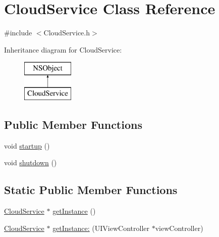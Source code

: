 \hypertarget{interface_cloud_service}{
\section{\-Cloud\-Service \-Class \-Reference}
\label{interface_cloud_service}
}


{\ttfamily \#include $<$\-Cloud\-Service.\-h$>$}

\-Inheritance diagram for \-Cloud\-Service\-:\begin{figure}[H]
\begin{center}
\leavevmode
\includegraphics[height=2.000000cm]{interface_cloud_service}
\end{center}
\end{figure}
\subsection*{\-Public \-Member \-Functions}
\begin{DoxyCompactItemize}
\item 
void \hyperlink{interface_cloud_service_aff6031f833c1fb320f87426fca9e11eb}{startup} ()
\item 
void \hyperlink{interface_cloud_service_ad3ebffc5f1cddabf2480d14d987de69f}{shutdown} ()
\end{DoxyCompactItemize}
\subsection*{\-Static \-Public \-Member \-Functions}
\begin{DoxyCompactItemize}
\item 
\hyperlink{interface_cloud_service}{\-Cloud\-Service} $\ast$ \hyperlink{interface_cloud_service_ac78380c69d50df0d62403cbb74e3567f}{get\-Instance} ()
\item 
\hyperlink{interface_cloud_service}{\-Cloud\-Service} $\ast$ \hyperlink{interface_cloud_service_a0480006076b2958b79852f8e197716f2}{get\-Instance\-:} (\-U\-I\-View\-Controller $\ast$view\-Controller)
\end{DoxyCompactItemize}
